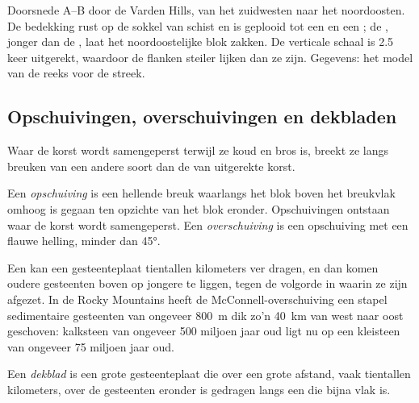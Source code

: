 \begin{omfigure}
{\small Doorsnede A--B door de Varden Hills, van het zuidwesten naar het
noordoosten. De bedekking rust op de sokkel van schist en is geplooid tot een
 en een ; de , jonger dan de , laat
het noordoostelijke blok zakken. De verticale schaal is 2.5 keer uitgerekt, waardoor
de flanken steiler lijken dan ze zijn. Gegevens: het model van de reeks voor de
streek.}
\end{omfigure}

\subsection{Opschuivingen, overschuivingen en dekbladen}

Waar de korst wordt samengeperst terwijl ze koud en bros is, breekt ze langs breuken
van een andere soort dan de  van uitgerekte korst.

\begin{definition}\label{def:g12:mountain-building:thrust}
Een \emph{opschuiving} is een hellende breuk waarlangs
het blok boven het breukvlak omhoog is gegaan ten opzichte van het blok
eronder. Opschuivingen ontstaan waar de korst wordt samengeperst. Een
\emph{overschuiving} is een opschuiving met een flauwe helling, minder dan
\ang{45}.
\end{definition}

Een  kan een gesteenteplaat tientallen kilometers ver dragen, en dan komen oudere
gesteenten boven op jongere te liggen, tegen de volgorde in waarin ze
zijn afgezet. In de Rocky Mountains heeft de McConnell-overschuiving een
stapel sedimentaire gesteenten van ongeveer \qty{800}{m} dik zo'n \qty{40}{km} van
west naar oost geschoven: kalksteen van ongeveer 500 miljoen jaar oud ligt nu op een kleisteen
van ongeveer 75 miljoen jaar oud.

\begin{definition}[Dekblad]\label{def:g12:mountain-building:nappe}
Een \emph{dekblad} is een grote gesteenteplaat die over een
grote afstand, vaak tientallen kilometers, over de gesteenten eronder is gedragen langs een
 die bijna vlak is.
\end{definition}

